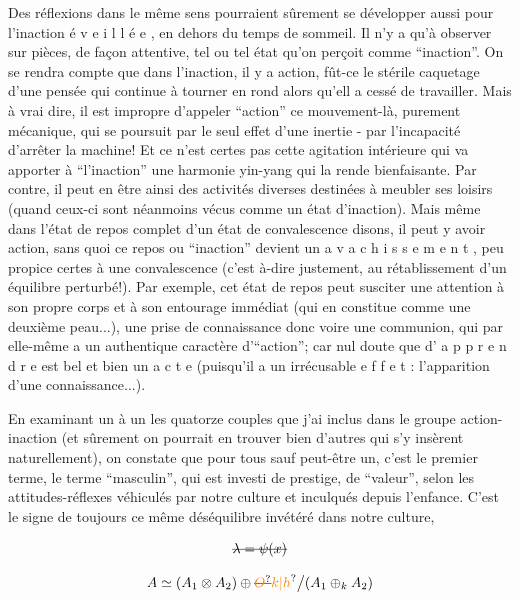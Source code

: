Des réflexions dans le même sens pourraient sûrement se développer aussi pour l'inaction é v e i l l é e , en dehors du temps de sommeil. Il n'y a qu'à observer sur pièces, de façon attentive, tel ou tel état qu'on perçoit comme ``inaction''. On se rendra compte que dans l'inaction, il y a action, fût-ce le stérile caquetage d'une pensée qui continue à tourner en rond alors qu'ell a cessé de travailler. Mais à vrai dire, il est impropre d'appeler ``action'' ce mouvement-là, purement mécanique, qui se poursuit par le seul effet d'une inertie - par l'incapacité d'arrêter la machine! Et ce n'est certes pas cette agitation intérieure qui va apporter à ``l'inaction'' une harmonie yin-yang qui la rende bienfaisante. Par contre, il peut en être ainsi des activités diverses destinées à meubler ses loisirs (quand ceux-ci sont néanmoins vécus comme un état d'inaction). Mais même dans l'état de repos complet d'un état de convalescence disons, il peut y avoir action, sans quoi ce repos ou ``inaction'' devient un a v a c h i s s e m e n t , peu propice certes à une convalescence (c'est à-dire justement, au rétablissement d'un équilibre perturbé!). Par exemple, cet état de repos peut susciter une attention à son propre corps et à son entourage immédiat (qui en constitue comme une deuxième peau...), une prise de connaissance donc voire une communion, qui par elle-même a un authentique caractère d'``action''; car nul doute que d' a p p r e n d r e est bel et bien un a c t e (puisqu'il a un irrécusable e f f e t : l'apparition d'une connaissance...).

En examinant un à un les quatorze couples que j'ai inclus dans le groupe action-inaction (et sûrement on pourrait en trouver bien d'autres qui s'y insèrent naturellement), on constate que pour tous sauf peut-être un, c'est le premier terme, le terme ``masculin'', qui est investi de prestige, de ``valeur'', selon les attitudes-réflexes véhiculés par notre culture et inculqués depuis l'enfance. C'est le signe de toujours ce même déséquilibre invétéré dans notre culture,


\[ \deleted{\lambda=\psi(x)} \]

\[ A\simeq(A_1\otimes A_2)\oplus\deleted{\unsure{O}}\unsure{k|h}\big/(A_1\oplus_k A_2) \]


